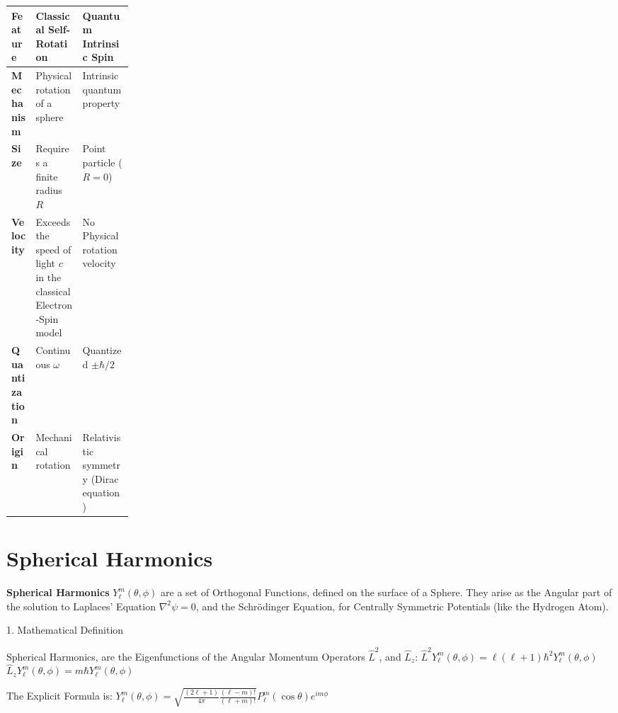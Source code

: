 \documentclass[a4paper, 10pt, onepage]{elegantbook}
\begin{document}
{\begin{table}[ht]
\centering
\begin{tabularx}{\linewidth}{
  >{\raggedright\arraybackslash}p{0.20\linewidth}
  >{\raggedright\arraybackslash}X
  >{\raggedright\arraybackslash}X
}
\toprule
\textbf{Feature} & \textbf{Classical Self-Rotation} &
\textbf{Quantum Intrinsic Spin} \\
\midrule
\textbf{Mechanism} & Physical rotation of a sphere &
Intrinsic quantum property \\

\textbf{Size} & Requires a finite radius $R$ &
Point particle ($R=0$) \\

\textbf{Velocity} & Exceeds the speed of light $c$ in the classical
Electron-Spin model &
No Physical rotation velocity \\

\textbf{Quantization} & Continuous $\omega$ &
Quantized $\pm \hbar/2$ \\

\textbf{Origin} & Mechanical rotation &
Relativistic symmetry (Dirac equation) \\
\bottomrule
\end{tabularx}
\end{table}

\newpage

\chapter{Spherical Harmonics}

\textbf{Spherical Harmonics} $Y_\ell^m(\theta, \phi)$ are a set of Orthogonal Functions, defined on the surface of a 
Sphere. They arise as the Angular part of the solution to Laplaces' Equation $\nabla^2 \psi = 0$, and the 
Schr\"odinger Equation, for Centrally Symmetric Potentials (like the Hydrogen Atom).  

    1. Mathematical Definition  

\noindent

Spherical Harmonics, are the Eigenfunctions of the Angular Momentum Operators $\hat{L}^2$, and $\hat{L}_z$:
$ \hat{L}^2 Y_\ell^m(\theta, \phi) = \ell(\ell+1)\hbar^2 Y_\ell^m(\theta, \phi) $  
$ \hat{L}_z Y_\ell^m(\theta, \phi) = m\hbar Y_\ell^m(\theta, \phi) $  

The Explicit Formula is:  
$ Y_\ell^m(\theta, \phi) = \sqrt{\frac{(2\ell+1)}{4\pi} \frac{(\ell-m)!}{(\ell+m)!}} P_\ell^m(\cos \theta) e^{im\phi} $ 
 

}
\end{document}
